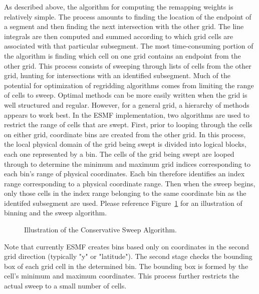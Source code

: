      As described above, the algorithm for computing the remapping weights
     is relatively simple.  The process amounts to finding the location of
     the endpoint of a segment and then finding the next intersection with
     the other grid.  The line integrals are then computed and summed according
     to which grid cells are associated with that particular subsegment.  The
     most time-consuming portion of the algorithm is finding which cell on one
     grid contains an endpoint from the other grid.  This process consists
     of sweeping through lists of cells from the other grid, hunting for
     intersections with an identified subsegment.   Much of the potential for
     optimization of regridding algorithms comes from limiting the range of
     cells to sweep.  Optimal methods can be more easily written when the grid
     is well structured and regular.  However, for a general grid, a hierarchy
     of methods appears to work best.  In the ESMF
     implementation, two algorithms are used to restrict the range of cells
     that are swept.  First, prior to looping through the cells on either grid,
     coordinate bins are created from the other grid.  In this process, the local
     physical domain of the grid being swept is divided into logical blocks, each
     one represented by a bin.  The cells of the grid being swept are looped through
     to determine the minimum and maximum grid indices corresponding to each bin's
     range of physical coordinates.  Each bin therefore identifies an index range
     corresponding to a physical coordinate range.  Then when the sweep begins,
     only those cells in the index range belonging to the same coordinate bin as
     the identifed subsegment are used.  Please reference
     Figure~\ref{fig:ConservSweep} for an illustration of binning and the sweep
     algorithm.

\begin{center}
\begin{figure}
\caption{Illustration of the Conservative Sweep Algorithm. }
\label{fig:ConservSweep}
\end{figure}
\end{center}

     Note that currently ESMF creates bins based
     only on coordinates in the second grid direction (typically "y" or "latitude").
     The second stage checks the bounding box of each grid cell in the determined
     bin.  The bounding box is formed by the cell's minimum and maximum coordinates.
     This process further restricts the actual sweep to a small number of cells.

